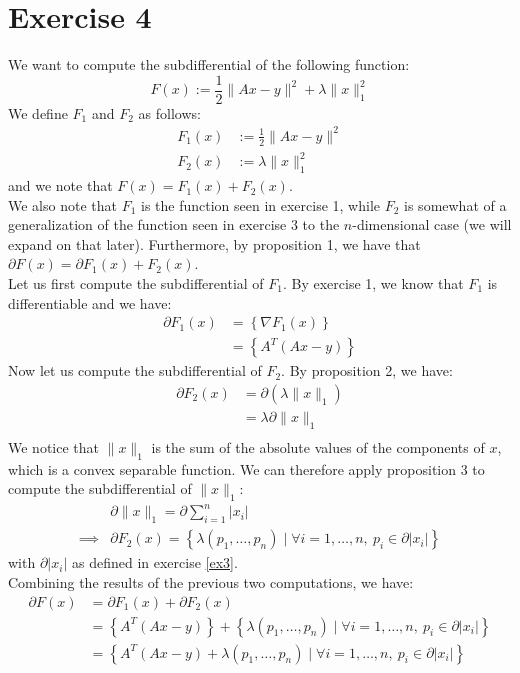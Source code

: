 \documentclass[12pt]{article}
\begin{document}
\section{Exercise 4}
We want to compute the subdifferential of the following function:
\begin{equation}
  F(x) := \frac{1}{2} \| Ax - y \|^2 + \lambda \| x \|_1^2
\end{equation}
We define $F_1$ and $F_2$ as follows:
\begin{align*}
  F_1(x) & := \frac{1}{2} \| Ax - y \|^2 \\
  F_2(x) & := \lambda \| x \|_1^2
\end{align*}
and we note that $F(x) = F_1(x) + F_2(x)$. \\
We also note that $F_1$ is the function seen in exercise 1, while $F_2$ is somewhat of a generalization of the function seen in exercise 3 to the $n$-dimensional case (we will expand on that later). Furthermore, by proposition 1, we have that $\partial F(x) = \partial F_1(x) + F_2(x)$.  \\
Let us first compute the subdifferential of $F_1$. By exercise 1, we know that $F_1$ is differentiable and we have:
\begin{align*}
  \partial F_1(x)
  &= \left\{ \nabla F_1(x) \right\} \\
  &= \left\{ A^T(Ax - y) \right\}
\end{align*}
Now let us compute the subdifferential of $F_2$. By proposition 2, we have:
\begin{align*}
  \partial F_2(x)
  &= \partial \left( \lambda \| x \|_1 \right) \\
  &= \lambda \partial \| x \|_1 \\
\end{align*}
We notice that $\| x \|_1$ is the sum of the absolute values of the components of $x$, which is a convex separable function. We can therefore apply proposition 3 to compute the subdifferential of $\| x \|_1$:
\begin{align*}
  &
  \partial \| x \|_1 = \partial \sum_{i=1}^n |x_i| \\
  \implies &
  \partial F_2(x) = \left\{ \lambda (p_1, \ldots, p_n) \mid \forall i = 1, \ldots, n,\ p_i \in \partial |x_i| \right\}
\end{align*}
with $\partial |x_i|$ as defined in exercise \ref{ex3}. \\
Combining the results of the previous two computations, we have:
\begin{align*}
  \partial F(x)
  &= \partial F_1(x) + \partial F_2(x) \\
  &= \left\{ A^T(Ax - y) \right\} + \left\{ \lambda (p_1, \ldots, p_n) \mid \forall i = 1, \ldots, n,\ p_i \in \partial |x_i| \right\} \\
  &= \left\{ A^T(Ax - y) + \lambda (p_1, \ldots, p_n) \mid \forall i = 1, \ldots, n,\ p_i \in \partial |x_i| \right\}
\end{align*}


\end{document}
